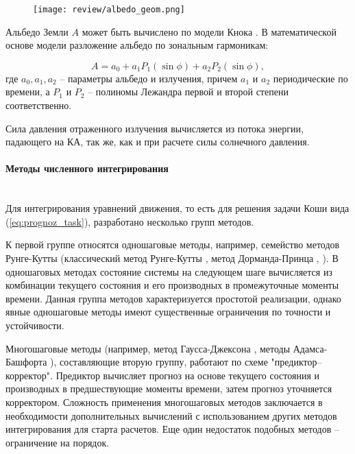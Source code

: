 \begin{figure}[h!]
    \centering
    \texttt{[image: review/albedo\_geom.png]}
    \label{fig:albedo_geom}
\end{figure}

Альбедо Земли $A$ может быть вычислено по модели Кнока \cite{Knocke1988}. В математической основе модели
разложение альбедо по зональным гармоникам:

\begin{equation*}
    A = a_0 + a_1 P_1 (\sin\phi) + a_2 P_2 (\sin \phi),
\end{equation*}
где $a_0, a_1, a_2$ -- параметры альбедо и излучения, причем $a_1$ и $a_2$ периодические по
времени, а $P_1$ и $P_2$ -- полиномы Лежандра первой и второй степени соответственно.

Сила давления отраженного излучения вычисляется из потока энергии, падающего на КА,
так же, как и при расчете силы солнечного давления.


\paragraph{Методы численного интегрирования} \mbox{} \\

Для интегрирования уравнений движения, то есть для решения задачи Коши вида (\ref{eq:prognoz_task}),
разработано несколько групп методов. 

К первой группе относятся одношаговые методы, например,
семейство методов Рунге-Кутты (классический метод Рунге-Кутты \cite{Kutta1901}, метод Дорманда-Принца \cite{Dormand1980}, \cite{Prince1981}).
В одношаговых методах состояние системы на следующем шаге вычисляется из комбинации
текущего состояния и его производных в промежуточные моменты времени. Данная группа
методов характеризуется простотой реализации,
однако явные одношаговые методы имеют существенные ограничения по точности и устойчивости.

Многошаговые методы (например, метод Гаусса-Джексона \cite{Berry2004}, 
методы Адамса-Башфорта \cite{Avdyushev2015}), 
составляющие вторую группу, работают по схеме "предиктор--корректор".
Предиктор вычисляет прогноз на основе текущего состояния и производных в предшествующие
моменты времени, затем прогноз уточняется корректором. Сложность применения 
многошаговых методов заключается в необходимости дополнительных вычислений с использованием
других методов интегрирования для старта расчетов. Еще один недостаток подобных методов -- 
ограничение на порядок.


